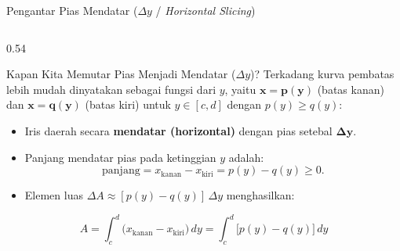 \documentclass[aspectratio=43,10pt]{beamer}
\begin{document}
\begin{frame}{Pengantar Pias Mendatar ($\Delta y$ / \textit{Horizontal Slicing})}
    \begin{columns}[c]
        \begin{column}{0.54\textwidth}
            \begin{block}{Kapan Kita Memutar Pias Menjadi Mendatar ($\Delta y$)?}
                \scriptsize\abovedisplayskip=3pt\belowdisplayskip=3pt
                Terkadang kurva pembatas lebih mudah dinyatakan sebagai fungsi dari $y$, yaitu $\mathbf{x = p(y)}$ (batas kanan) dan $\mathbf{x = q(y)}$ (batas kiri) untuk $y \in [c, d]$ dengan $p(y) \ge q(y)$:
                \begin{itemize}\itemsep=2pt
                    \item Iris daerah secara \textbf{mendatar (horizontal)} dengan pias setebal $\mathbf{\Delta y}$.
                    \item Panjang mendatar pias pada ketinggian $y$ adalah:
                    $$\text{panjang} = x_{\text{kanan}} - x_{\text{kiri}} = p(y) - q(y) \ge 0.$$
                    \item Elemen luas $\Delta A \approx [p(y) - q(y)]\,\Delta y$ menghasilkan:
                \end{itemize}
                $$\boxed{A = \int_{c}^{d} \big(x_{\text{kanan}} - x_{\text{kiri}}\big)\,dy = \int_{c}^{d} \big[p(y) - q(y)\big]\,dy}$$
            \end{block}
        \end{column}


\end{columns}
\end{frame}
\end{document}
